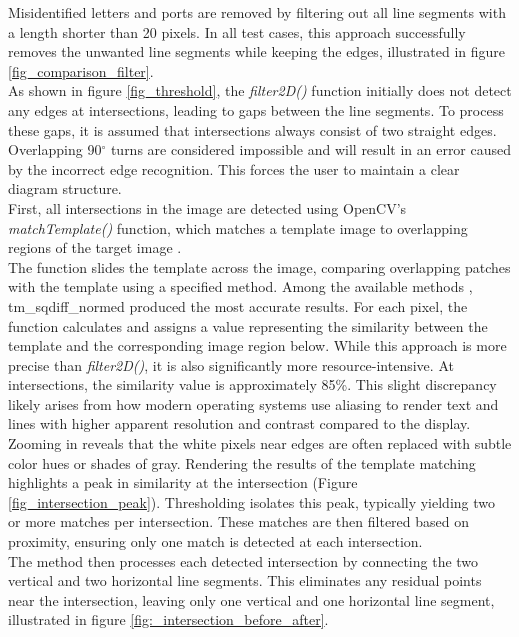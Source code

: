 Misidentified letters and ports are removed by filtering out all line segments with a length shorter than 20 pixels. In all test cases, this approach successfully removes the unwanted line segments while keeping the edges, illustrated in figure \ref{fig_comparison_filter}.\\
As shown in figure \ref{fig_threshold}, the \textit{filter2D()} function initially does not detect any edges at intersections, leading to gaps between the line segments. To process these gaps, it is assumed that intersections always consist of two straight edges. Overlapping 90$^{\circ}$ turns are considered impossible and will result in an error caused by the incorrect edge recognition. This forces the user to maintain a clear diagram structure.\\
First, all intersections in the image are detected using OpenCV's \textit{matchTemplate()} function, which matches a template image to overlapping regions of the target image \cite{web_matchTemplate}.\\
The function slides the template across the image, comparing overlapping patches with the template using a specified method. Among the available methods \cite{comparison_methods}, tm\_sqdiff\_normed produced the most accurate results. For each pixel, the function calculates and assigns a value representing the similarity between the template and the corresponding image region below. While this approach is more precise than \textit{filter2D()}, it is also significantly more resource-intensive.
At intersections, the similarity value is approximately 85\%. This slight discrepancy likely arises from how modern operating systems use aliasing to render text and lines with higher apparent resolution and contrast compared to the display. Zooming in reveals that the white pixels near edges are often replaced with subtle color hues or shades of gray. Rendering the results of the template matching highlights a peak in similarity at the intersection (Figure \ref{fig_intersection_peak}). Thresholding isolates this peak, typically yielding two or more matches per intersection. These matches are then filtered based on proximity, ensuring only one match is detected at each intersection.\\
The method then processes each detected intersection by connecting the two vertical and two horizontal line segments. This eliminates any residual points near the intersection, leaving only one vertical and one horizontal line segment, illustrated in figure \ref{fig:_intersection_before_after}.\\
